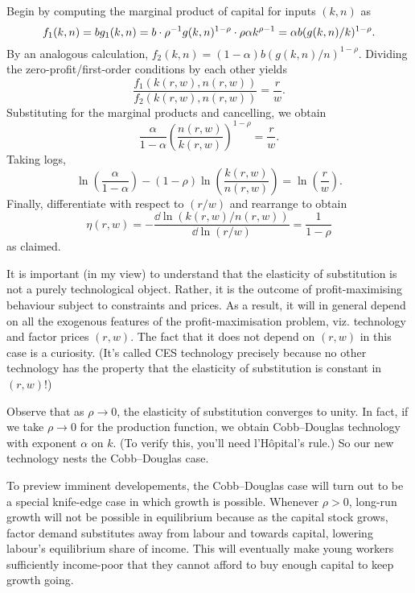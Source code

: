 \documentclass[11pt,letterpaper,reqno,oneside]{article}
\begin{document}
Begin by computing the marginal product of capital for inputs $(k,n)$ as
%
\begin{equation*}
	f_1(k,n)
	= b g_1(k,n) 
	= b \cdot \rho^{-1} g(k,n)^{1-\rho} \cdot \rho \alpha k^{\rho-1}
	\\
	= \alpha b ( g(k,n) / k )^{1-\rho} .
\end{equation*}
%
By an analogous calculation, $f_2(k,n) = (1-\alpha) b (g(k,n)/n)^{1-\rho}$. Dividing the zero-profit/first-order conditions by each other yields
%
\begin{equation*}
	\frac{ f_1(k(r,w),n(r,w)) }{ f_2(k(r,w),n(r,w)) } = \frac{r}{w} .
\end{equation*}
%
Substituting for the marginal products and cancelling, we obtain
%
\begin{equation*}
	\frac{ \alpha }{ 1-\alpha } 
	\left( \frac{ n(r,w) }{ k(r,w) } \right)^{1-\rho}
	= \frac{ r }{ w } .
\end{equation*}
%
Taking logs, 
%
\begin{equation*}
	\ln\left( \frac{ \alpha }{ 1-\alpha } \right)
	- (1-\rho) \ln\left( \frac{ k(r,w) }{ n(r,w) } \right)
	= \ln\left( \frac{ r }{ w } \right) .
\end{equation*}
%
Finally, differentiate with respect to $(r/w)$ and rearrange to obtain
%
\begin{equation*}
	\eta(r,w) 
	= - \frac{ \dd \ln( k(r,w)/n(r,w) ) }{ \dd \ln( r/w ) }
	= \frac{1}{1-\rho} 
\end{equation*}
%
as claimed.

It is important (in my view) to understand that the elasticity of substitution is not a purely technological object. Rather, it is the outcome of profit-maximising behaviour subject to constraints and prices. As a result, it will in general depend on all the exogenous features of the profit-maximisation problem, viz. technology and factor prices $(r,w)$. The fact that it does not depend on $(r,w)$ in this case is a curiosity. (It's called CES technology precisely because no other technology has the property that the elasticity of substitution is constant in $(r,w)$!)

Observe that as $\rho \to 0$, the elasticity of substitution converges to unity. In fact, if we take $\rho \to 0$ for the production function, we obtain Cobb--Douglas technology with exponent $\alpha$ on $k$. (To verify this, you'll need l'Hôpital's rule.) So our new technology nests the Cobb--Douglas case.

To preview imminent developements, the Cobb--Douglas case will turn out to be a special knife-edge case in which growth is possible. Whenever $\rho>0$, long-run growth will not be possible in equilibrium because as the capital stock grows, factor demand substitutes away from labour and towards capital, lowering labour's equilibrium share of income. This will eventually make young workers sufficiently income-poor that they cannot afford to buy enough capital to keep growth going.
\end{document}
